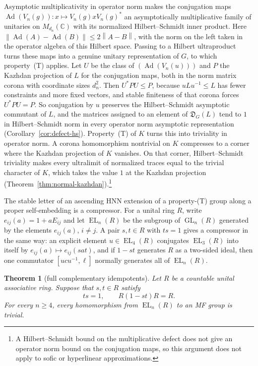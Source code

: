 \documentclass[11pt]{amsart}
\newcommand{\leanverified}[2]{\ignorespaces}
\theoremstyle{plain}
\newtheorem{mainthm}{Theorem}
\newcommand{\C}{\mathbb C}
\newcommand{\GL}{\operatorname{GL}}
\newcommand{\EL}{\operatorname{EL}}
\newcommand{\opnorm}[1]{\left\lVert #1\right\rVert}
\begin{document}
Asymptotic multiplicativity in operator norm makes the conjugation maps
$\operatorname{Ad}(V_n(g))\colon x\mapsto V_n(g)xV_n(g)^*$ an asymptotically
multiplicative family of unitaries on $M_{d_n}(\C)$ with its normalized
Hilbert--Schmidt inner product.  Here
$\opnorm{\operatorname{Ad}(A)-\operatorname{Ad}(B)}\le2\opnorm{A-B}$, with
the norm on the left taken in the operator algebra of this Hilbert space.
Passing to a Hilbert ultraproduct turns these maps into a genuine unitary
representation of $G$, to which property~\textup{(T)} applies.  Let $U$ be
the class of $(\operatorname{Ad}(V_n(u)))$ and $P$ the Kazhdan projection
of $L$ for the conjugation maps, both in the norm matrix corona with
coordinate sizes $d_n^2$.  Then $U^*PU\le P$, because $uLu^{-1}\le L$ has
fewer constraints and more fixed vectors, and stable finiteness of that
corona forces $U^*PU=P$.  So conjugation by $u$ preserves the
Hilbert--Schmidt asymptotic commutant of $L$, and the matrices assigned to an element of
$\mathfrak D_G(L)$ tend to $1$ in Hilbert--Schmidt norm in every operator
norm asymptotic representation (Corollary~\ref{cor:defect-hs}).
Property~\textup{(T)} of $K$ turns this into triviality in operator norm.
A corona homomorphism nontrivial on $K$ compresses to a corner where the
Kazhdan projection of $K$ vanishes.  On that corner, Hilbert--Schmidt
triviality makes every ultralimit of normalized traces equal to the trivial
character of $K$, which takes the value $1$ at the Kazhdan projection
(Theorem~\ref{thm:normal-kazhdan}).\footnote{A
Hilbert--Schmidt bound on the multiplicative defect does not give an
operator norm bound on the conjugation maps, so this argument does not
apply to sofic or hyperlinear approximations.}
\leanverified{Manuscript/OneSidedMFRadical/PrintedRemarks}{GroupApproximation.Manuscript.OneSidedMFRadical.manuscriptFullRadicalsDoNotEntailNonsoficity}

The stable letter of an ascending HNN extension of a property-\textup{(T)}
group along a proper self-embedding is a compressor.  For a unital ring
$R$, write $e_{ij}(a)=1+aE_{ij}$ and let $\EL_n(R)$ be the subgroup of
$\GL_n(R)$ generated by the elements $e_{ij}(a)$, $i\ne j$.  A pair
$s,t\in R$ with $ts=1$ gives a compressor in the same way: an explicit
element $u\in\EL_4(R)$ conjugates $\EL_3(R)$ into itself by
$e_{ij}(a)\mapsto e_{ij}(sat)$, and if $1-st$ generates $R$ as a
two-sided ideal, then one commutator $[ucu^{-1},\ell]$ normally
generates all of $\EL_n(R)$.

\begin{mainthm}[full complementary idempotents]\label{thm:full-defect-ring}
Let $R$ be a countable unital associative ring.  Suppose that $s,t\in R$
satisfy
\[
 ts=1,\qquad R(1-st)R=R.
\]
For every $n\ge4$, every homomorphism from $\EL_n(R)$ to an MF group is
trivial.
\end{mainthm}
\end{document}
